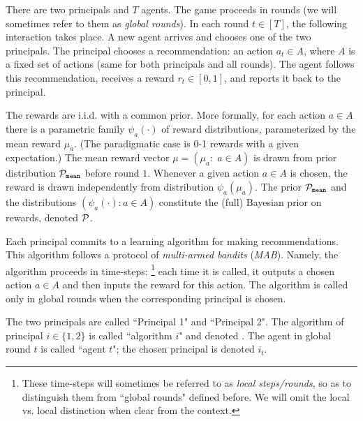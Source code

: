 There are two principals and $T$ agents. The game proceeds in rounds (we will sometimes refer to them as \emph{global rounds}). In each round $t\in [T]$, the following  interaction takes place. A new agent arrives and chooses one of the two principals. The principal chooses a recommendation: an action $a_t\in A$, where $A$ is a fixed set of actions (same for both principals and all rounds). The agent follows this recommendation, receives a reward $r_t\in [0,1]$, and reports it back to the principal.

The rewards are i.i.d. with a common prior. More formally, for each action $a\in A$ there is a parametric family $\psi_a(\cdot)$ of
reward distributions, parameterized by the mean reward $\mu_a$. (The paradigmatic case is 0-1 rewards with a given expectation.) The
mean reward vector $\mu = (\mu_a:\; a\in A)$ is drawn from prior distribution $\mathcal{P}_\mathtt{mean}$ before round $1$. Whenever a given action $a\in A$ is chosen, the reward is drawn independently from distribution $\psi_a(\mu_a)$. The prior $\mathcal{P}_\mathtt{mean}$ and the distributions $(\psi_a(\cdot)\colon a\in A)$ constitute the (full) Bayesian prior on rewards, denoted $\mathcal{P}$.

Each principal commits to a learning algorithm for making recommendations. This algorithm follows a protocol of \emph{multi-armed bandits} (\emph{MAB}). Namely, the algorithm proceeds in time-steps:%
\footnote{These time-steps will sometimes be referred to as \emph{local steps/rounds}, so as to distinguish them from ``global rounds" defined before. We will omit the local vs. local distinction when clear from the context.} each time it is called, it outputs a chosen action $a\in A$ and then inputs the reward for this action. The algorithm is called only in global rounds when the corresponding principal is chosen.

 The two principals are called ``Principal
1" and ``Principal 2".
The algorithm of principal $i\in \{1,2\}$ is called ``algorithm $i$" and denoted
\alg[i]. The agent in global round $t$ is called ``agent $t$"; the
chosen principal is denoted $i_t$.

